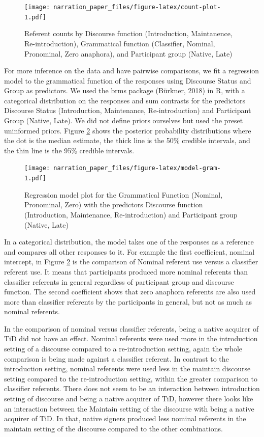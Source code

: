 \documentclass[
  english,
  doc,mask]{apa6}
\begin{document}
\begin{figure}
\centering
\texttt{[image: narration\_paper\_files/figure-latex/count-plot-1.pdf]}
\caption{\label{fig:count-plot}Referent counts by Discourse function (Introduction, Maintanence, Re-introduction), Grammatical function (Classifier, Nominal, Pronominal, Zero anaphora), and Participant group (Native, Late)}
\end{figure}

For more inference on the data and have pairwise comparisons, we fit a regression model to the grammatical function of the responses using Discourse Status and Group as predictors. We used the brms package (Bürkner, 2018) in R, with a categorical distribution on the responses and sum contrasts for the predictors Discourse Status (Introduction, Maintenance, Re-introduction) and Participant Group (Native, Late). We did not define priors ourselves but used the preset uninformed priors. Figure \ref{fig:model-gram} shows the posterior probability distributions where the dot is the median estimate, the thick line is the 50\% credible intervals, and the thin line is the 95\% credible intervals.

\begin{figure}
\centering
\texttt{[image: narration\_paper\_files/figure-latex/model-gram-1.pdf]}
\caption{\label{fig:model-gram}Regression model plot for the Grammatical Function (Nominal, Pronominal, Zero) with the predictors Discourse function (Introduction, Maintenance, Re-introduction) and Participant group (Native, Late)}
\end{figure}

In a categorical distribution, the model takes one of the responses as a reference and compares all other responses to it. For example the first coefficient, nominal intercept, in Figure \ref{fig:model-gram} is the comparison of Nominal referent use versus a classifier referent use. It means that participants produced more nominal referents than classifier referents in general regardless of participant group and discourse function. The second coefficient shows that zero anaphora referents are also used more than classifier referents by the participants in general, but not as much as nominal referents.

In the comparison of nominal versus classifier referents, being a native acquirer of TiD did not have an effect. Nominal referents were used more in the introduction setting of a discourse compared to a re-introduction setting, again the whole comparison is being made against a classifier referent. In contrast to the introduction setting, nominal referents were used less in the maintain discourse setting compared to the re-introduction setting, within the greater comparison to classifier referents. There does not seem to be an interaction between introduction setting of discourse and being a native acquirer of TiD, however there looks like an interaction between the Maintain setting of the discourse with being a native acquirer of TiD. In that, native signers produced less nominal referents in the maintain setting of the discourse compared to the other combinations.
\end{document}
